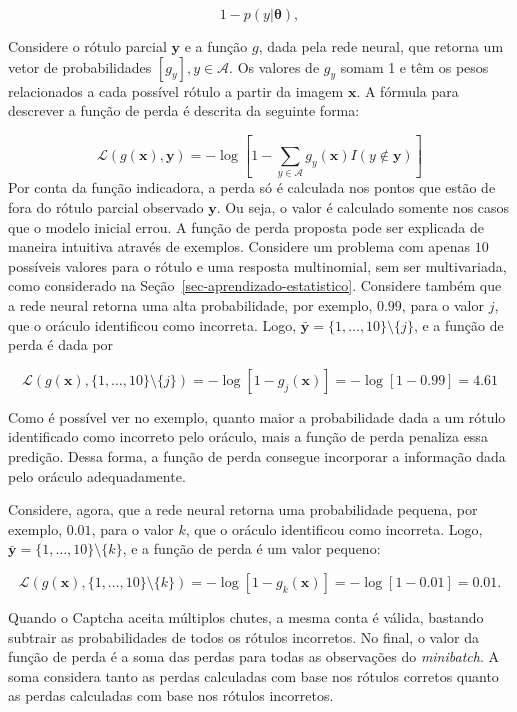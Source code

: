 \documentclass[12pt,twoside,brazilian]{book}
\begin{document}
\[
1 - p(y|\boldsymbol \theta),
\]

Considere o rótulo parcial \({\mathbf y}\) e a função \(g\), dada pela
rede neural, que retorna um vetor de probabilidades
\([g_y], y \in \mathcal A\). Os valores de \(g_y\) somam 1 e têm os
pesos relacionados a cada possível rótulo a partir da imagem
\(\mathbf x\). A fórmula para descrever a função de perda é descrita da
seguinte forma:

\[
\mathcal L(g(\mathbf x), {\mathbf y}) = -\log\left[1 - \sum_{y \in \mathcal A} {g_y}(\mathbf x) I(y\notin {\mathbf y})\right]
\] Por conta da função indicadora, a perda só é calculada nos pontos que
estão de fora do rótulo parcial observado \(\mathbf y\). Ou seja, o
valor é calculado somente nos casos que o modelo inicial errou. A função
de perda proposta pode ser explicada de maneira intuitiva através de
exemplos. Considere um problema com apenas \(10\) possíveis valores para
o rótulo e uma resposta multinomial, sem ser multivariada, como
considerado na Seção~\ref{sec-aprendizado-estatistico}. Considere também
que a rede neural retorna uma alta probabilidade, por exemplo, \(0.99\),
para o valor \(j\), que o oráculo identificou como incorreta. Logo,
\(\mathbf {\bar y} = \{1,\dots,10\}\setminus \{j\}\), e a função de
perda é dada por

\[
\mathcal L(g(\mathbf x), \{1,\dots,10\}\setminus \{j\}) = -\log\left[1-{g_j}(\mathbf x)\right] = -\log\left[1-0.99 \right] = 4.61
\]

Como é possível ver no exemplo, quanto maior a probabilidade dada a um
rótulo identificado como incorreto pelo oráculo, mais a função de perda
penaliza essa predição. Dessa forma, a função de perda consegue
incorporar a informação dada pelo oráculo adequadamente.

Considere, agora, que a rede neural retorna uma probabilidade pequena,
por exemplo, \(0.01\), para o valor \(k\), que o oráculo identificou
como incorreta. Logo,
\(\mathbf {\bar y} = \{1,\dots,10\}\setminus \{k\}\), e a função de
perda é um valor pequeno:

\[
\mathcal L(g(\mathbf x), \{1,\dots,10\}\setminus \{k\}) = -\log\left[1-{g_k}(\mathbf x)\right] = -\log\left[1-0.01 \right] = 0.01.
\]

Quando o Captcha aceita múltiplos chutes, a mesma conta é válida,
bastando subtrair as probabilidades de todos os rótulos incorretos. No
final, o valor da função de perda é a soma das perdas para todas as
observações do \emph{minibatch}. A soma considera tanto as perdas
calculadas com base nos rótulos corretos quanto as perdas calculadas com
base nos rótulos incorretos.
\end{document}

